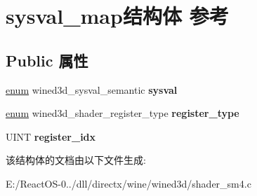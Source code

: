 \hypertarget{structsysval__map}{}\section{sysval\+\_\+map结构体 参考}
\label{structsysval__map}
\subsection*{Public 属性}
\begin{DoxyCompactItemize}
\item 
\mbox{\label{structsysval__map_a3837a72d1bac0b9485417aa560c77fea}} 
\hyperlink{interfaceenum}{enum} wined3d\+\_\+sysval\+\_\+semantic {\bfseries sysval}
\item 
\mbox{\label{structsysval__map_a4123eaecdbb0fd83c6f0a1a32686b30d}} 
\hyperlink{interfaceenum}{enum} wined3d\+\_\+shader\+\_\+register\+\_\+type {\bfseries register\+\_\+type}
\item 
\mbox{\label{structsysval__map_a657085ae276520c45c042659ad087b74}} 
U\+I\+NT {\bfseries register\+\_\+idx}
\end{DoxyCompactItemize}


该结构体的文档由以下文件生成\+:\begin{DoxyCompactItemize}
\item 
E\+:/\+React\+O\+S-\/0../dll/directx/wine/wined3d/shader\+\_\+sm4.\+c\end{DoxyCompactItemize}

